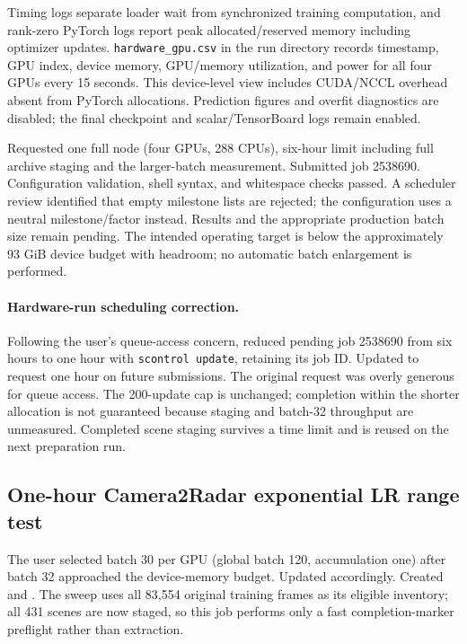 \documentclass[11pt,a4paper]{article}
\begin{document}
Timing logs separate loader wait from synchronized training computation, and rank-zero PyTorch logs report peak allocated/reserved memory including optimizer updates. \texttt{hardware\_gpu.csv} in the run directory records timestamp, GPU index, device memory, GPU/memory utilization, and power for all four GPUs every 15 seconds. This device-level view includes CUDA/NCCL overhead absent from PyTorch allocations. Prediction figures and overfit diagnostics are disabled; the final checkpoint and scalar/TensorBoard logs remain enabled.

Requested one full node (four GPUs, 288 CPUs), six-hour limit including full archive staging and the larger-batch measurement. Submitted job 2538690. Configuration validation, shell syntax, and whitespace checks passed. A scheduler review identified that empty milestone lists are rejected; the configuration uses a neutral milestone/factor instead. Results and the appropriate production batch size remain pending. The intended operating target is below the approximately 93 GiB device budget with headroom; no automatic batch enlargement is performed.

\paragraph{Hardware-run scheduling correction.}
Following the user's queue-access concern, reduced pending job 2538690 from six hours to one hour with \texttt{scontrol update}, retaining its job ID. Updated  to request one hour on future submissions. The original request was overly generous for queue access. The 200-update cap is unchanged; completion within the shorter allocation is not guaranteed because staging and batch-32 throughput are unmeasured. Completed scene staging survives a time limit and is reused on the next preparation run.

\subsection{One-hour Camera2Radar exponential LR range test}
The user selected batch 30 per GPU (global batch 120, accumulation one) after batch 32 approached the device-memory budget. Updated  accordingly. Created  and . The sweep uses all 83,554 original training frames as its eligible inventory; all 431 scenes are now staged, so this job performs only a fast completion-marker preflight rather than extraction.
\end{document}
